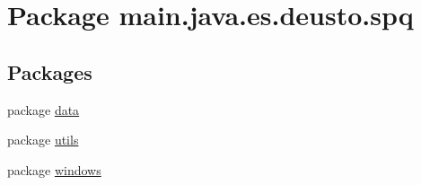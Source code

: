 \hypertarget{namespacemain_1_1java_1_1es_1_1deusto_1_1spq}{}\section{Package main.\+java.\+es.\+deusto.\+spq}
\label{namespacemain_1_1java_1_1es_1_1deusto_1_1spq}
\subsection*{Packages}
\begin{DoxyCompactItemize}
\item 
package \hyperlink{namespacemain_1_1java_1_1es_1_1deusto_1_1spq_1_1data}{data}
\item 
package \hyperlink{namespacemain_1_1java_1_1es_1_1deusto_1_1spq_1_1utils}{utils}
\item 
package \hyperlink{namespacemain_1_1java_1_1es_1_1deusto_1_1spq_1_1windows}{windows}
\end{DoxyCompactItemize}

